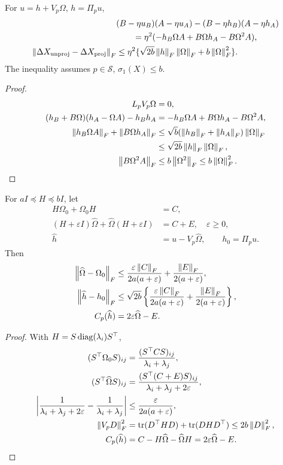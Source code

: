 \begin{proposition}
\label{prop:correct-drift}
For $u=h+V_p\Omega$, $h=\Pi_pu$,
\begin{align}
&(B-\eta u_B)(A-\eta u_A)-(B-\eta h_B)(A-\eta h_A)\notag\\
&\qquad=\eta^2(-h_B\Omega A+B\Omega h_A-B\Omega^2A),\\
\left\lVert\Delta X_{\rm unproj}-\Delta X_{\rm proj}\right\rVert_F
&\leq\eta^2\{\sqrt{2b}\left\lVert h\right\rVert_F\left\lVert\Omega\right\rVert_F+b\left\lVert\Omega\right\rVert_F^2\}.
\label{eq:rigid-mixed}
\end{align}
The inequality assumes $p\in\mathcal S$, $\sigma_1(X)\leq b$.
\end{proposition}
\begin{proof}
\begin{align}
L_pV_p\Omega&=0,\\
(h_B+B\Omega)(h_A-\Omega A)-h_Bh_A
&=-h_B\Omega A+B\Omega h_A-B\Omega^2A,\\
\left\lVert h_B\Omega A\right\rVert_F+\left\lVert B\Omega h_A\right\rVert_F
&\leq\sqrt b(\left\lVert h_B\right\rVert_F+\left\lVert h_A\right\rVert_F)\left\lVert\Omega\right\rVert_F\\
&\leq\sqrt{2b}\left\lVert h\right\rVert_F\left\lVert\Omega\right\rVert_F,\\
\left\lVert B\Omega^2A\right\rVert_F&\leq b\left\lVert\Omega^2\right\rVert_F\leq b\left\lVert\Omega\right\rVert_F^2.
\end{align}
\end{proof}

\begin{proposition}
\label{prop:connection-error}
For $aI\preceq H\preceq bI$, let
\begin{align}
H\Omega_0+\Omega_0H&=C,\\
(H+\varepsilon I)\widehat\Omega+
\widehat\Omega(H+\varepsilon I)&=C+E,\quad\varepsilon\geq0,\\
\widehat h&=u-V_p\widehat\Omega,\qquad h_0=\Pi_pu .
\end{align}
Then
\begin{align}
\left\lVert\widehat\Omega-\Omega_0\right\rVert_F
&\leq\frac{\varepsilon\left\lVert C\right\rVert_F}{2a(a+\varepsilon)}
+\frac{\left\lVert E\right\rVert_F}{2(a+\varepsilon)},\\
\left\lVert\widehat h-h_0\right\rVert_F
&\leq\sqrt{2b}\left\{
\frac{\varepsilon\left\lVert C\right\rVert_F}{2a(a+\varepsilon)}
+\frac{\left\lVert E\right\rVert_F}{2(a+\varepsilon)}\right\},\\
C_p(\widehat h)&=2\varepsilon\widehat\Omega-E.
\label{eq:rigid-damping}
\end{align}
\end{proposition}
\begin{proof}
With $H=S\operatorname{diag}(\lambda_i)S^\top$,
\begin{align}
(S^\top\Omega_0S)_{ij}
&=\frac{(S^\top CS)_{ij}}{\lambda_i+\lambda_j},\\
(S^\top\widehat\Omega S)_{ij}
&=\frac{(S^\top(C+E)S)_{ij}}{\lambda_i+\lambda_j+2\varepsilon},\\
\left|\frac1{\lambda_i+\lambda_j+2\varepsilon}
-\frac1{\lambda_i+\lambda_j}\right|
&\leq\frac{\varepsilon}{2a(a+\varepsilon)},\\
\left\lVert V_pD\right\rVert_F^2
&=\operatorname{tr}(D^\top HD)+\operatorname{tr}(DHD^\top)\leq2b\left\lVert D\right\rVert_F^2,\\
C_p(\widehat h)&=C-H\widehat\Omega-\widehat\Omega H
=2\varepsilon\widehat\Omega-E.
\end{align}
\end{proof}


